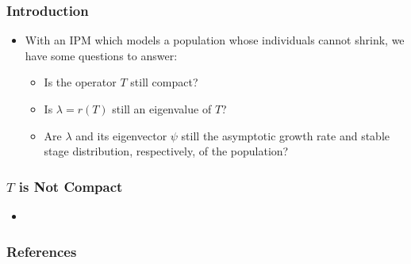 \documentclass{beamer}
\begin{document}
\begin{frame}
	\frametitle{Introduction}
	\begin{itemize}
		\item With an IPM which models a population whose individuals cannot shrink, we have some questions to answer:
		\pause
		\begin{itemize}
			\item Is the operator $T$ still compact?
			\pause
			\item Is $\lambda = r(T)$ still an eigenvalue of $T$?
			\pause
			\item Are $\lambda$ and its eigenvector $\psi$ still the asymptotic growth rate and stable stage distribution, respectively, of the population?
		\end{itemize}
	\end{itemize}
\end{frame}

\begin{frame}
	\frametitle{$T$ is Not Compact}
	\begin{itemize}
		\item 
	\end{itemize}
\end{frame}

\begin{frame}[allowframebreaks]
	\frametitle{References}
		\printbibliography
\end{frame}

\end{document}
